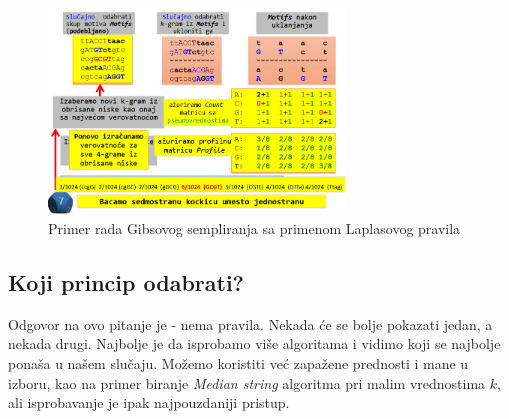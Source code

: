 \begin{figure}[h]
\centering
\includegraphics[width=0.7\textwidth]{poglavlja/2/slike/84.PNG}
\caption{Primer rada Gibsovog sempliranja sa primenom Laplasovog pravila}
\label{slika: gibs i laplas}
\end{figure}

\subsection{Koji princip odabrati?}
Odgovor na ovo pitanje je - nema pravila. Nekada će se bolje pokazati jedan, a nekada drugi. Najbolje je da isprobamo više algoritama i vidimo koji se najbolje ponaša u našem slučaju. Možemo koristiti već zapažene prednosti i mane u izboru, kao na primer biranje \textit{Median string} algoritma pri malim vrednostima $k$, ali isprobavanje je ipak najpouzdaniji pristup.

